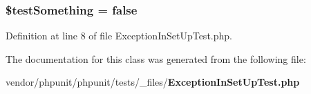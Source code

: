 \subsubsection[{\$test\+Something}]{\setlength{\rightskip}{0pt plus 5cm}\${\bf test\+Something} = false}\label{class_exception_in_set_up_test_a25acbdb5bf8dc30b31f537d60bfb02f5}


Definition at line 8 of file Exception\+In\+Set\+Up\+Test.\+php.



The documentation for this class was generated from the following file\+:\begin{DoxyCompactItemize}
\item 
vendor/phpunit/phpunit/tests/\+\_\+files/{\bf Exception\+In\+Set\+Up\+Test.\+php}\end{DoxyCompactItemize}
